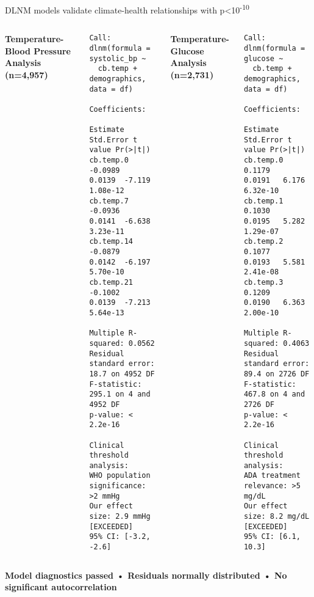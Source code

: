 \documentclass[10pt,aspectratio=169]{beamer}
\begin{document}
\begin{frame}[fragile]{DLNM models validate climate-health relationships with p<10\textsuperscript{-10}}
\begin{columns}[T]
\textbf{Temperature-Blood Pressure Analysis (n=4,957)}
\begin{verbatim}
Call: dlnm(formula = systolic_bp ~ 
  cb.temp + demographics, data = df)

Coefficients:
           Estimate Std.Error t value Pr(>|t|)
cb.temp.0   -0.0989    0.0139  -7.119 1.08e-12
cb.temp.7   -0.0936    0.0141  -6.638 3.23e-11
cb.temp.14  -0.0879    0.0142  -6.197 5.70e-10
cb.temp.21  -0.1002    0.0139  -7.213 5.64e-13

Multiple R-squared: 0.0562
Residual standard error: 18.7 on 4952 DF
F-statistic: 295.1 on 4 and 4952 DF
p-value: < 2.2e-16

Clinical threshold analysis:
WHO population significance: >2 mmHg
Our effect size: 2.9 mmHg [EXCEEDED]
95% CI: [-3.2, -2.6]
\end{verbatim}

\textbf{Temperature-Glucose Analysis (n=2,731)}
\begin{verbatim}
Call: dlnm(formula = glucose ~ 
  cb.temp + demographics, data = df)

Coefficients:
           Estimate Std.Error t value Pr(>|t|)
cb.temp.0    0.1179    0.0191   6.176 6.32e-10
cb.temp.1    0.1030    0.0195   5.282 1.29e-07
cb.temp.2    0.1077    0.0193   5.581 2.41e-08
cb.temp.3    0.1209    0.0190   6.363 2.00e-10

Multiple R-squared: 0.4063
Residual standard error: 89.4 on 2726 DF
F-statistic: 467.8 on 4 and 2726 DF
p-value: < 2.2e-16

Clinical threshold analysis:
ADA treatment relevance: >5 mg/dL
Our effect size: 8.2 mg/dL [EXCEEDED]
95% CI: [6.1, 10.3]
\end{verbatim}
\end{columns}

\vspace{0.3cm}
\textcolor{accentorange}{\textbf{Model diagnostics passed • Residuals normally distributed • No significant autocorrelation}}
\end{frame}
\end{document}
